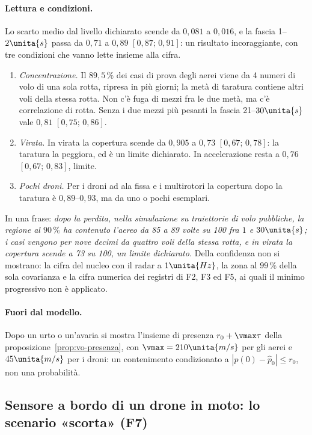 \paragraph{Lettura e condizioni.} Lo scarto medio dal livello dichiarato scende da $0{,}081$ a $0{,}016$, e la fascia 1--$2\unita{s}$ passa da $0{,}71$ a $0{,}89$ $[0{,}87;\,0{,}91]$: un risultato incoraggiante, con tre condizioni che vanno lette insieme alla cifra.
\begin{enumerate}[label=\arabic*.]
\item \emph{Concentrazione.} Il $89{,}5\,\%$ dei casi di prova degli aerei viene da 4 numeri di volo di una sola rotta, ripresa in più giorni; la metà di taratura contiene altri voli della stessa rotta. Non c'è fuga di mezzi fra le due metà, ma c'è correlazione di rotta. Senza i due mezzi più pesanti la fascia 21--$30\unita{s}$ vale $0{,}81$ $[0{,}75;\,0{,}86]$.
\item \emph{Virata.} In virata la copertura scende da $0{,}905$ a $0{,}73$ $[0{,}67;\,0{,}78]$: la taratura la peggiora, ed è un limite dichiarato. In accelerazione resta a $0{,}76$ $[0{,}67;\,0{,}83]$, limite.
\item \emph{Pochi droni.} Per i droni ad ala fissa e i multirotori la copertura dopo la taratura è $0{,}89$--$0{,}93$, ma da uno o pochi esemplari.
\end{enumerate}
In una frase: \emph{dopo la perdita, nella simulazione su traiettorie di volo pubbliche, la regione al $90\,\%$ ha contenuto l'aereo da 85 a 89 volte su 100 fra $1$ e $30\unita{s}$; i casi vengono per nove decimi da quattro voli della stessa rotta, e in virata la copertura scende a 73 su 100, un limite dichiarato.} Della confidenza non si mostrano: la cifra del nucleo con il radar a $1\unita{Hz}$, la zona al $99\,\%$ della sola covarianza e la cifra numerica dei registri di F2, F3 ed F5, ai quali il minimo progressivo non è applicato.

\paragraph{Fuori dal modello.} Dopo un urto o un'avaria si mostra l'insieme di presenza $r_0+\vmax\tau$ della proposizione~\ref{prop:vo-presenza}, con $\vmax=210\unita{m/s}$ per gli aerei e $45\unita{m/s}$ per i droni: un contenimento condizionato a $|p(0)-\hat p_0|\le r_0$, non una probabilità.

\subsection{Sensore a bordo di un drone in moto: lo scenario «scorta» (F7)}\label{sec:vo-scorta}

